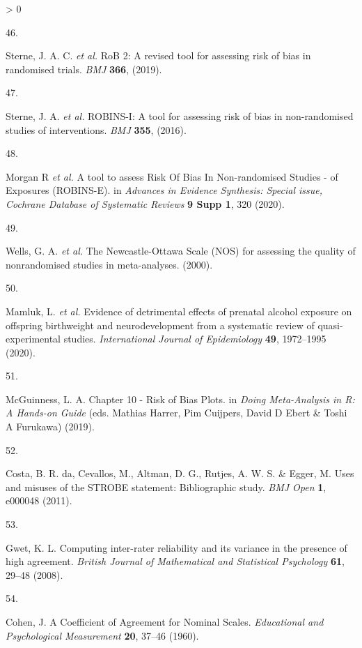 \documentclass[a4paper, twoside]{templates/ociamthesis}
\newlength{\cslhangindent}
\newlength{\csllabelwidth}
\newenvironment{CSLReferences}[3] %
 {%
  \setlength{\parindent}{0pt}
  \ifodd #1 \everypar{\setlength{\hangindent}{\cslhangindent}}\ignorespaces\fi
  \ifnum #2 > 0
  \setlength{\parskip}{#2\baselineskip}
  \fi
 }%
 {}
\newcommand{\CSLLeftMargin}[1]{\parbox[t]{\maxof{\widthof{#1}}{\csllabelwidth}}{#1}}
\newcommand{\CSLRightInline}[1]{\parbox[t]{\linewidth - \csllabelwidth}{#1}}
\begin{document}
\begin{CSLReferences}{0}{0}
\leavevmode\hypertarget{ref-sterne2019}{}%
\CSLLeftMargin{46. }
\CSLRightInline{Sterne, J. A. C. \emph{et al.} {RoB} 2: A revised tool for assessing risk of bias in randomised trials. \emph{BMJ} \textbf{366}, (2019).}

\leavevmode\hypertarget{ref-sterne2016}{}%
\CSLLeftMargin{47. }
\CSLRightInline{Sterne, J. A. \emph{et al.} {ROBINS}-{I}: A tool for assessing risk of bias in non-randomised studies of interventions. \emph{BMJ} \textbf{355}, (2016).}

\leavevmode\hypertarget{ref-morganr2020}{}%
\CSLLeftMargin{48. }
\CSLRightInline{Morgan R \emph{et al.} A tool to assess {Risk Of Bias In Non}-randomised {Studies} - of {Exposures} ({ROBINS}-{E}). in \emph{Advances in {Evidence Synthesis}: Special issue, {Cochrane Database} of {Systematic Reviews}} \textbf{9 Supp 1}, 320 (2020).}

\leavevmode\hypertarget{ref-wells2000newcastle}{}%
\CSLLeftMargin{49. }
\CSLRightInline{Wells, G. A. \emph{et al.} The {Newcastle}-{Ottawa Scale} ({NOS}) for assessing the quality of nonrandomised studies in meta-analyses. (2000).}

\leavevmode\hypertarget{ref-mamluk2020}{}%
\CSLLeftMargin{50. }
\CSLRightInline{Mamluk, L. \emph{et al.} Evidence of detrimental effects of prenatal alcohol exposure on offspring birthweight and neurodevelopment from a systematic review of quasi-experimental studies. \emph{International Journal of Epidemiology} \textbf{49}, 1972--1995 (2020).}

\leavevmode\hypertarget{ref-mcguinness2019}{}%
\CSLLeftMargin{51. }
\CSLRightInline{McGuinness, L. A. Chapter 10 - {Risk} of {Bias Plots}. in \emph{Doing {Meta}-{Analysis} in {R}: {A Hands}-on {Guide}} (eds. Mathias Harrer, Pim Cuijpers, David D Ebert \& Toshi A Furukawa) (2019).}

\leavevmode\hypertarget{ref-costa2011}{}%
\CSLLeftMargin{52. }
\CSLRightInline{Costa, B. R. da, Cevallos, M., Altman, D. G., Rutjes, A. W. S. \& Egger, M. Uses and misuses of the {STROBE} statement: Bibliographic study. \emph{BMJ Open} \textbf{1}, e000048 (2011).}

\leavevmode\hypertarget{ref-gwet2008}{}%
\CSLLeftMargin{53. }
\CSLRightInline{Gwet, K. L. Computing inter-rater reliability and its variance in the presence of high agreement. \emph{British Journal of Mathematical and Statistical Psychology} \textbf{61}, 29--48 (2008).}

\leavevmode\hypertarget{ref-cohen1960}{}%
\CSLLeftMargin{54. }
\CSLRightInline{Cohen, J. A {Coefficient} of {Agreement} for {Nominal Scales}. \emph{Educational and Psychological Measurement} \textbf{20}, 37--46 (1960).}


\end{CSLReferences}
\end{document}
